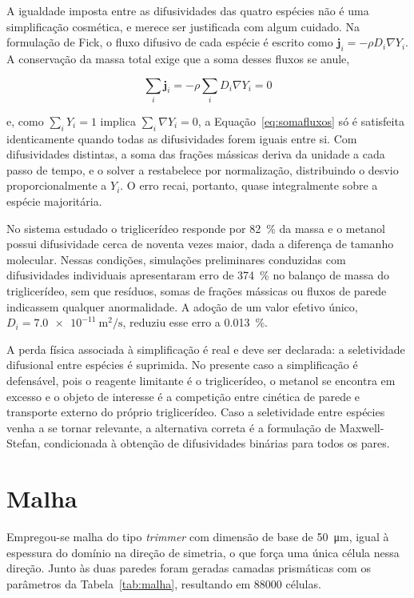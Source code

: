 A igualdade imposta entre as difusividades das quatro espécies não é uma
simplificação cosmética, e merece ser justificada com algum cuidado. Na
formulação de Fick, o fluxo difusivo de cada espécie é escrito como
$\mathbf{j}_i = -\rho D_i \nabla Y_i$. A conservação da massa total exige que a
soma desses fluxos se anule,

\begin{equation}
\sum_i \mathbf{j}_i = -\rho \sum_i D_i \nabla Y_i = 0
\label{eq:somafluxos}
\end{equation}

\noindent
e, como $\sum_i Y_i = 1$ implica $\sum_i \nabla Y_i = 0$, a
Equação~\eqref{eq:somafluxos} só é satisfeita identicamente quando todas as
difusividades forem iguais entre si. Com difusividades distintas, a soma das
frações mássicas deriva da unidade a cada passo de tempo, e o solver a
restabelece por normalização, distribuindo o desvio proporcionalmente a $Y_i$.
O erro recai, portanto, quase integralmente sobre a espécie majoritária.

No sistema estudado o triglicerídeo responde por \SI{82}{\percent} da massa e o
metanol possui difusividade cerca de noventa vezes maior, dada a diferença de
tamanho molecular. Nessas condições, simulações preliminares conduzidas com
difusividades individuais apresentaram erro de \SI{374}{\percent} no balanço de
massa do triglicerídeo, sem que resíduos, somas de frações mássicas ou fluxos de
parede indicassem qualquer anormalidade. A adoção de um valor efetivo único,
$D_i = \SI{7.0e-11}{\meter\squared\per\second}$, reduziu esse erro a
\SI{0.013}{\percent}.

A perda física associada à simplificação é real e deve ser declarada: a
seletividade difusional entre espécies é suprimida. No presente caso a
simplificação é defensável, pois o reagente limitante é o triglicerídeo, o
metanol se encontra em excesso e o objeto de interesse é a competição entre
cinética de parede e transporte externo do próprio triglicerídeo. Caso a
seletividade entre espécies venha a se tornar relevante, a alternativa correta é
a formulação de Maxwell-Stefan, condicionada à obtenção de difusividades
binárias para todos os pares.

\section{Malha}

Empregou-se malha do tipo \textit{trimmer} com dimensão de base de
\SI{50}{\micro\meter}, igual à espessura do domínio na direção de simetria, o
que força uma única célula nessa direção. Junto às duas paredes foram geradas
camadas prismáticas com os parâmetros da Tabela~\ref{tab:malha}, resultando em
\num{88000} células.

